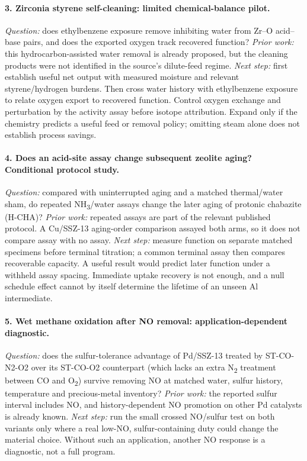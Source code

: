 \paragraph{3. Zirconia styrene self-cleaning: limited chemical-balance pilot.}
\emph{Question:} does ethylbenzene exposure remove inhibiting water from Zr--O acid--base pairs, and does the exported oxygen track recovered function? \emph{Prior work:} this hydrocarbon-assisted water removal is already proposed, but the cleaning products were not identified in the source's dilute-feed regime.\citep{artsiusheuski2025} \emph{Next step:} first establish useful net output with measured moisture and relevant styrene/hydrogen burdens. Then cross water history with ethylbenzene exposure to relate oxygen export to recovered function. Control oxygen exchange and perturbation by the activity assay before isotope attribution. Expand only if the chemistry predicts a useful feed or removal policy; omitting steam alone does not establish process savings.

\paragraph{4. Does an acid-site assay change subsequent zeolite aging? Conditional protocol study.}
\emph{Question:} compared with uninterrupted aging and a matched thermal/water sham, do repeated NH\textsubscript{3}/water assays change the later aging of protonic chabazite (H-CHA)? \emph{Prior work:} repeated assays are part of the relevant published protocol. A Cu/SSZ-13 aging-order comparison assayed both arms, so it does not compare assay with no assay.\citep{classmartinez2026,luo2018} \emph{Next step:} measure function on separate matched specimens before terminal titration; a common terminal assay then compares recoverable capacity. A useful result would predict later function under a withheld assay spacing. Immediate uptake recovery is not enough, and a null schedule effect cannot by itself determine the lifetime of an unseen Al intermediate.

\paragraph{5. Wet methane oxidation after NO removal: application-dependent diagnostic.}
\emph{Question:} does the sulfur-tolerance advantage of Pd/SSZ-13 treated by ST-CO-N2-O2 over its ST-CO-O2 counterpart (which lacks an extra N\textsubscript{2} treatment between CO and O\textsubscript{2}) survive removing NO at matched water, sulfur history, temperature and precious-metal inventory? \emph{Prior work:} the reported sulfur interval includes NO, and history-dependent NO promotion on other Pd catalysts is already known.\citep{ryu2024,auvinen2021} \emph{Next step:} run the small crossed NO/sulfur test on both variants only where a real low-NO, sulfur-containing duty could change the material choice. Without such an application, another NO response is a diagnostic, not a full program.

